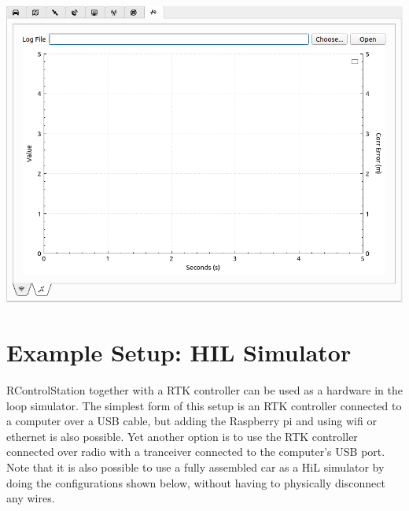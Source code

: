 \documentclass[12pt]{article} %
\def\printtodos{0}
\newcommand{\todo}[1]{
  \if\printtodos1
      {\color{red} \textbf{TODO:} #1}
  \fi}
\begin{document}
\begin{minipage}{0.3\linewidth}
\noindent \includegraphics[width=\textwidth]{./screens/Log3.png}
\end{minipage}





\section{Example Setup: HIL Simulator}

RControlStation together with a RTK controller can be used as a
hardware in the loop simulator. The simplest form of this setup is an
RTK controller connected to a computer over a USB cable, but adding
the Raspberry pi and using wifi or ethernet is also possible. Yet
another option is to use the RTK controller connected over radio with
a tranceiver connected to the computer's USB port. Note that it is
also possible to use a fully assembled car as a HiL simulator by doing
the configurations shown below, without having to physically
disconnect any wires. 
\end{document}
